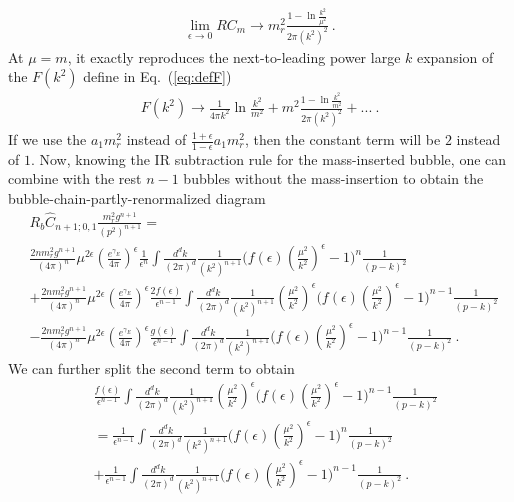 \documentclass[a4paper,11pt]{article}
\begin{document}
\begin{align}
\lim_{\epsilon\rightarrow0}RC_m\rightarrow m_r^2\frac{1-\ln \frac{k^2}{\mu^2}}{2\pi (k^2)^2} \ .
\end{align}
At $\mu=m$, it exactly reproduces the next-to-leading power large $k$ expansion of the $F(k^2)$ define in Eq.~(\ref{eq:defF})
\begin{align}
F(k^2) \rightarrow\frac{1}{4\pi k^2}\ln \frac{k^2}{m^2}+m^2\frac{1-\ln\frac{k^2}{m^2}}{2\pi (k^2)^2 }+... \ .
\end{align}
If we use the $a_1m_r^2$ instead of $\frac{1+\epsilon}{1-\epsilon}a_1m_r^2$, then the constant term will be $2$ instead of $1$.  Now, knowing the IR subtraction rule for the mass-inserted bubble,  one can combine with the rest $n-1$ bubbles without the mass-insertion to obtain the bubble-chain-partly-renormalized diagram
\begin{align}
&R_b \hat C_{n+1;0,1}\frac{m_r^2g^{n+1}}{(p^2)^{n+1}}=\nonumber \\ 
&\frac{2nm_r^2g^{n+1}}{(4\pi)^n}\mu^{2\epsilon}\left(\frac{e^{\gamma_E}}{4\pi}\right)^{\epsilon}\frac{1}{\epsilon^n}\int\frac{d^dk}{(2\pi)^d}\frac{1}{(k^2)^{n+1}}\bigg(f(\epsilon)\left(\frac{\mu^2}{k^2}\right)^{\epsilon}-1\bigg)^n\frac{1}{(p-k)^2} \nonumber \\
&+\frac{2nm_r^2g^{n+1}}{(4\pi)^n}\mu^{2\epsilon}\left(\frac{e^{\gamma_E}}{4\pi}\right)^{\epsilon}\frac{2f(\epsilon)}{\epsilon^{n-1}}\int\frac{d^dk}{(2\pi)^d}\frac{1}{(k^2)^{n+1}}\left(\frac{\mu^2}{k^2}\right)^{\epsilon}\bigg(f(\epsilon)\left(\frac{\mu^2}{k^2}\right)^{\epsilon}-1\bigg)^{n-1}\frac{1}{(p-k)^2} \  \nonumber \\ 
&-\frac{2nm_r^2g^{n+1}}{(4\pi)^n}\mu^{2\epsilon}\left(\frac{e^{\gamma_E}}{4\pi}\right)^{\epsilon}\frac{g(\epsilon)}{\epsilon^{n-1}}\int\frac{d^dk}{(2\pi)^d}\frac{1}{(k^2)^{n+1}}\bigg(f(\epsilon)\left(\frac{\mu^2}{k^2}\right)^{\epsilon}-1\bigg)^{n-1}\frac{1}{(p-k)^2} \ .
\end{align}
We can further split the second term to obtain
\begin{align}
&\frac{f(\epsilon)}{\epsilon^{n-1}}\int\frac{d^dk}{(2\pi)^d}\frac{1}{(k^2)^{n+1}}\left(\frac{\mu^2}{k^2}\right)^{\epsilon}\bigg(f(\epsilon)\left(\frac{\mu^2}{k^2}\right)^{\epsilon}-1\bigg)^{n-1}\frac{1}{(p-k)^2}\nonumber \\
&=\frac{1}{\epsilon^{n-1}}\int\frac{d^dk}{(2\pi)^d}\frac{1}{(k^2)^{n+1}}\bigg(f(\epsilon)\left(\frac{\mu^2}{k^2}\right)^{\epsilon}-1\bigg)^{n}\frac{1}{(p-k)^2} \nonumber \\ 
&+\frac{1}{\epsilon^{n-1}}\int\frac{d^dk}{(2\pi)^d}\frac{1}{(k^2)^{n+1}}\bigg(f(\epsilon)\left(\frac{\mu^2}{k^2}\right)^{\epsilon}-1\bigg)^{n-1}\frac{1}{(p-k)^2} \ .
\end{align}
\end{document}
